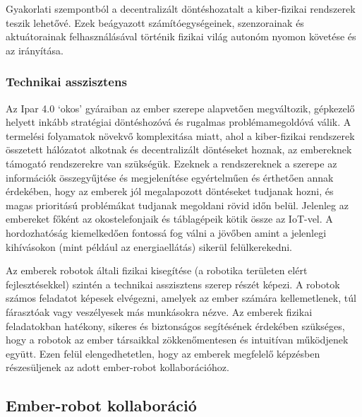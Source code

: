 \documentclass[../documentation.tex]{subfiles}
\begin{document}
Gyakorlati szempontból a decentralizált döntéshozatalt a kiber-fizikai rendszerek teszik lehetővé. Ezek beágyazott számítóegységeinek, szenzorainak és aktuátorainak felhasználásával történik fizikai világ autonóm nyomon követése és az irányítása.  

\subsubsection{Technikai asszisztens}
Az Ipar 4.0 `okos' gyáraiban az ember szerepe alapvetően megváltozik, gépkezelő helyett inkább stratégiai döntéshozóvá és rugalmas problémamegoldóvá válik. A termelési folyamatok növekvő komplexitása miatt, ahol a kiber-fizikai rendszerek összetett hálózatot alkotnak és decentralizált döntéseket hoznak, az embereknek támogató rendszerekre van szükségük. Ezeknek a rendszereknek a szerepe az információk összegyűjtése és megjelenítése egyértelműen és érthetően annak érdekében, hogy az emberek jól megalapozott döntéseket tudjanak hozni, és magas prioritású problémákat tudjanak megoldani rövid időn belül. Jelenleg az embereket főként az okostelefonjaik és táblagépeik kötik össze az IoT-vel\cite{fromiot2ioe}. A hordozhatóság kiemelkedően fontossá fog válni a jövőben amint a jelenlegi kihívásokon (mint például az energiaellátás) sikerül felülkerekedni.

Az emberek robotok általi fizikai kisegítése (a robotika területen elért fejlesztésekkel) szintén a technikai asszisztens szerep részét képezi. A robotok számos feladatot képesek elvégezni, amelyek az ember számára kellemetlenek, túl fárasztóak vagy veszélyesek más munkásokra nézve\cite{hri}. Az emberek fizikai feladatokban hatékony, sikeres és biztonságos segítésének érdekében szükséges, hogy a robotok az ember társaikkal zökkenőmentesen és intuitívan működjenek együtt\cite{hri}. Ezen felül elengedhetetlen, hogy az emberek megfelelő képzésben részesüljenek az adott ember-robot kollaborációhoz\cite{m-learning}.

\subsection{Ember-robot kollaboráció}
\end{document}
